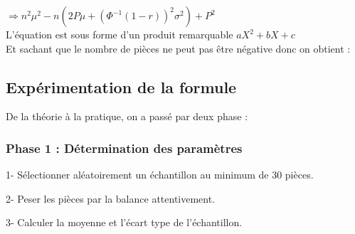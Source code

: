 \documentclass[12pt, a4paper]{thesis}
\begin{document}
$\Longrightarrow n ^{2} \mu^2 - n ( 2 P \mu +(\Phi^{-1}(1-r))^{2} \sigma^{2}) + P^{2}  $\\
 L'équation est sous forme d'un produit remarquable $ a X^{2}+ b X + c $\\
 Et sachant que le nombre de pièces ne peut pas être négative donc on obtient : \\
 


\subsection{Expérimentation de la formule}
De la théorie à la pratique, on a passé par deux phase :
\subsubsection{Phase 1 : Détermination des paramètres} 
\item 1- Sélectionner aléatoirement un échantillon au minimum de 30 pièces. 
\item 2- Peser les pièces par la balance attentivement.
\item 3- Calculer la moyenne et l'écart type de l'échantillon.
\end{document}
